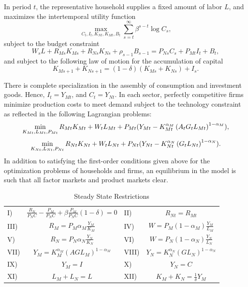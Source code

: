 \documentclass[12pt,fleqn]{article}
\begin{document}
In period $t$, the representative household supplies a fixed amount
of labor
$L$, and maximizes the intertemporal utility function%
\begin{equation}
\max_{C_{t},I_{t},K_{Nt},K_{Mt},B_{t}}\sum_{s=t}^{\infty }\beta
^{s-t}\log C_{s},
\end{equation}%
subject to the budget constraint
\begin{equation}
W_{s}L+R_{Ms}K_{Ms}+R_{Ns}K_{Ns}+\rho
_{s-1}B_{s-1}=P_{Ns}C_{s}+P_{Mt}I_{t}+B_{t},
\end{equation}%
and subject to the following law of motion for the accumulation of
capital
\begin{equation}
K_{Ms+1}+K_{Ns+1}=(1-\delta )(K_{Ms}+K_{Ns})+I_{s}.
\end{equation}

There is complete specialization in the assembly of consumption and
investment goods. Hence, $I_{t}=Y_{Mt}$, and $C_{t}=Y_{Nt}$. In each
sector, perfectly competitive firms minimize production costs to
meet demand subject to the technology constraint as reflected in the
following Lagrangian
problems:%
\begin{equation}
\min_{K_{Mt},L_{Mt},P_{Mt}}R_{Mt}K_{Mt}+W_{t}L_{Mt}+P_{Mt}(Y_{Mt}-K_{Mt}^{%
\alpha _{M}}\left( A_{t}G_t L_{Mt}\right) ^{1-\alpha _{M}}),
\end{equation}%
\begin{equation}
\min_{K_{Nt},L_{Nt},P_{Nt}}R_{Nt}K_{Nt}+W_{t}L_{Nt}+P_{Nt}(Y_{Nt}-K_{Nt}^{%
\alpha _{N}}\left( G_{t}L_{Nt}\right) ^{1-\alpha _{N}}).
\end{equation}%
In addition to satisfying the first-order conditions given above for
the optimization problems of households and firms, an equilibrium in
the model is such that all factor markets and product markets clear.

\begin{table}[tbp]
\caption{Steady State Restrictions} \label{SSrestrictions}\center
\begin{tabular}{|l|c|l|c|}
\hline
I) & $\frac{R_{N}}{P_{N}C}-\frac{P_{M}}{P_{N}C}+\beta \frac{P_{M}}{P_{N}C}%
(1-\delta)=0$ & II) & $R_{Nt}=R_{Mt}$ \\
III) & $R_{M}=P_{M}\alpha _{M}\frac{Y_{M}}{K_{M}}$ & IV) &
$W=P_{M}(1-\alpha
_{M})\frac{Y_{M}}{L_{M}}$ \\
V) & $R_{N}=P_{N}\alpha _{N}\frac{Y_{N}}{K_{N}}$ & VI) &
$W=P_{N}(1-\alpha
_{N})\frac{Y_{N}}{L_{N}}$ \\
VII) & $Y_{M}=K_{M}^{\alpha _{M}}(A G L_{M})^{1-\alpha _{M}}$ & VIII) & $%
Y_{N}=K_{N}^{\alpha _{N}}(G L_{N})^{1-\alpha _{N}}$ \\
IX) & $Y_{M}=I$ & X) & $Y_{N}=C$ \\
XI) & $L_{M}+L_{N}=L$ & XII) & $K_M+K_N = \frac{1}{\delta} Y_M$ \\
\hline
\end{tabular}%
\end{table}
\end{document}
